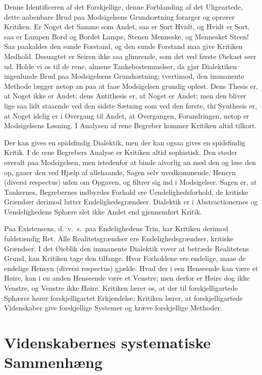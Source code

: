 \documentclass[12pt]{book}
\newcommand{\apage}[1]{\marginnote{\footnotesize\textit{[#1]}}}
\begin{document}
Denne Identificeren af det Forskjellige, denne Forblanding af det
Uligeartede, dette aabenbare Brud paa Modsigelsens Grundsætning forarger og
oprører Kritiken. Er Noget det Samme som Andet, saa er Sort Hvidt, og Hvidt
er Sort, saa er Lampen Bord og Bordet Lampe, Stenen Menneske, og Mennesket
Steen! Saa paakaldes den sunde Forstand, og den sunde Forstand maa give
Kritiken Medhold. Desuagtet er Seiren ikke saa glimrende, som det ved
første Øiekast seer ud. Holde vi os til de rene, almene Tankebestemmelser,
da gjør Dialektiken ingenlunde Brud paa Modsigelsens Grundsætning;
tvertimod, den immanente Methode lægger netop an paa at faae Modsigelsen
grundig opløst. Dens Thesis er, at Noget ikke er Andet; dens Antithesis er,
at Noget er Andet; men den bliver lige \apage{79} saa lidt staaende ved den sidste
Sætning som ved den første, thi Synthesis er, at Noget idelig er i Overgang
til Andet, at Overgangen, Forandringen, netop er Modsigelsens Løsning. I
Analysen af rene Begreber kommer Kritiken altid tilkort.

Der kan gives en spidsfindig Dialektik, men der kan ogsaa gives en
spidsfindig Kritik. I de rene Begrebers Analyse er Kritiken altid
sophistisk. Den støder overalt paa Modsigelsen, men istedenfor at binde
alvorlig an med den og løse den op, gaaer den ved Hjælp af allehaande,
Sagen selv uvedkommende, Hensyn (diversi respectus) uden om
Opgaven, og filtrer sig ind i Modsigelser. Sagen er, at Tankernes,
Begrebernes indbyrdes Forhold ere Uendelighedsforhold, de kritiske
Grændser derimod lutter Endelighedsgrændser. Dialektik er i Abstractionernes
og Uendelighedens Sphære slet ikke Andet end gjennemført Kritik.

Paa Existensens, d.\ v.\ s.\ paa Endelighedens Trin, har Kritiken derimod
fuldstændig Ret. Alle Realitetsgrændser ere Endelighedsgrændser, kritiske
Grændser. I det Øieblik den immanente Dialektik vover at betræde
Realitetens Grund, kan Kritiken tage den tilfange. Hvor Forholdene ere
endelige, maae de endelige Hensyn (diversi respectus) gjælde.
Hvad der i een Henseende kan være et Høire, kan i en anden Henseende være
et Venstre; men derfor er Høire dog ikke Venstre, og Venstre ikke Høire.
Kritiken lærer os, at der til forskjelligartede Sphærer hører
forskjelligartet Erkjendelse; Kritiken lærer, at forskjelligartede
\apage{80} Videnskaber give forskjellige Systemer og kræve forskjellige Methoder.

\section{Videnskabernes systematiske Sammenhæng}
\label{sec:9}
\end{document}

